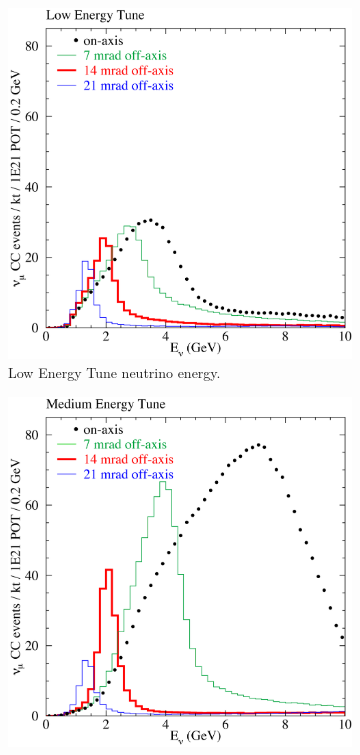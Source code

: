 \begin{figure}
  \centering
  \begin{subfigure}[b]{0.45\textwidth}
    \includegraphics[width=\textwidth]{../../img/baird/beam/040-le-spectra.png}
    \caption{Low Energy Tune neutrino energy.  }
    \label{fig:NuESpectra_MEAndLE_a}
  \end{subfigure}
  \hfill
  \begin{subfigure}[b]{0.45\textwidth}
    \includegraphics[width=\textwidth]{../../img/baird/beam/050-me-spectra.png}

\end{subfigure}
\end{figure}
